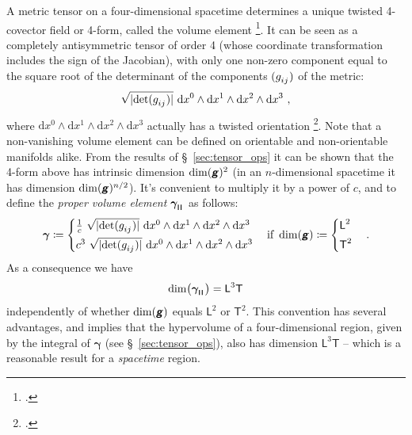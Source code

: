 \documentclass[\ifafour a4paper,12pt,\else a5paper,10pt,\fi%
onecolumn,oneside,article,%
british%
]{memoir}
\makeatletter
\theoremstyle{remark}
\theoremstyle{innote}
\newcommand*{\mathte}[1]{\textbf{\textit{\textsf{#1}}}}
\newcommand*{\citep}{\footcites}
\newcommand*{\delt}{\deltaup}%
\newcommand*{\di}{\mathrm{d}}%
\newcommand*{\defd}{\coloneqq}
\DeclarePairedDelimiter\abs{\lvert}{\rvert}
\renewcommand*{\|}[1][]{\nonscript\,#1\vert\nonscript\;\mathopen{}}
\newcommand*{\sect}{\S}%
\newcommand*{\chap}{ch.}%
\newcommand*{\q}{}%
\DeclareRobustCommand*{\q}{%
  \mathord{\mathpalette\bigcdot@{}}%
}
\newcommand*{\bigcdot@scalefactor}{0.7}
\newcommand*{\bigcdot@widthfactor}{1.5}
\newcommand*{\bigcdot@}[2]{%
  \sbox0{$#1\vcenter{}$}%
  \sbox2{$#1\cdot\m@th$}%
  \hbox to \bigcdot@widthfactor\wd2{%
    \hfil
    \raise\ht0\hbox{%
      \scalebox{\bigcdot@scalefactor}{%
        \lower\ht0\hbox{$#1\bullet\m@th$}%
      }%
    }%
    \hfil
  }%
}
\newcommand*{\Le}{\textsf{L}}
\newcommand*{\Ti}{\textsf{T}}
\newcommand*{\Li}{\textsf{L}}
\newcommand*{\yg}{\mathte{g}}
\renewcommand*{\i}{\indices}
\newcommand*{\dix}[1][i]{\di x^{#1}}
\newcommand*{\ye}{\bm{e}}
\newcommand*{\ygv}{\bm{\gamma}}
\newcommand*{\rul}{{\mkern2mu\rule[-0.1ex]{0.75pt}{1.1ex}\mkern2mu}}
\DeclarePairedDelimiter\mul{\rul}{\rul}%
\makeatother
\begin{document}
A metric tensor on a four-dimensional spacetime determines a unique twisted
4-covector field or 4-form, called the volume element
\citep[\sect~V.24]{derham1955_t1984}[\sect~V.A.4]{choquetbruhatetal1977_r1996}[\sect~6.2]{abrahametal1983_r1988}.
It can be seen as a completely antisymmetric tensor of order 4 (whose
coordinate transformation includes the sign of the Jacobian), with only one
non-zero component equal to the square root of the determinant of
the %
components $(g\i{_{ij}})$ of the metric:
\begin{equation*}
  \label{eq:undim_volume_elem}
  \sqrt{\smash[b]{\abs{\det(g\i{_{ij}})}}}\ \dix[0]\land\dix[1]\land\dix[2]\land\dix[3] \ ,
\end{equation*}
where
$\dix[0]\land\dix[1]\land\dix[2]\land\dix[3]$ %
actually has a twisted orientation \citep[\chap~6 p.~60,
\chap.~9]{frankel1979}. Note that a non-vanishing volume element can be
defined on orientable and non-orientable manifolds alike. From the results
of \sect~\ref{sec:tensor_ops} it can be shown that the 4-form above has
intrinsic dimension $\dim(\yg)^{2}$ (in an $n$-dimensional spacetime it has
dimension $\dim(\yg)^{n/2}$). It's convenient to multiply it by a power of
$c$, and to define the \emph{proper volume element}
$\ygv\i{_{\mul{\q\q\q\q}}}$ as follows:
\begin{equation}
  \label{eq:volume_elem}
  \ygv \defd
      \begin{cases}
        \frac{1}{c}\
        \sqrt{\smash[b]{\abs{\det(g\i{_{ij}})}}}\ \dix[0]\land\dix[1]\land\dix[2]\land\dix[3] 
     \\[\jot]
        c^{3}\
        \sqrt{\smash[b]{\abs{\det(g\i{_{ij}})}}}\ \dix[0]\land\dix[1]\land\dix[2]\land\dix[3] 
  \end{cases}
  \text{if }\dim(\yg)\defd
  \begin{cases}
    \Le^2 \\[\jot]
     \Ti^2
  \end{cases}.
\end{equation}
As a consequence we have
\begin{equation}
  \label{eq:dim_volume_elem}
  \dim\bigl(\ygv\i{_{\mul{\q\q\q\q}}}\bigr) = \Le^{3}\Ti
\end{equation}
independently of whether $\dim(\yg)$ equals $\Li^{2}$ or $\Ti^{2}$. This
convention has several advantages, and implies that the hypervolume of a
four-dimensional region, given by the integral of $\ygv$ (see
\sect~\ref{sec:tensor_ops}), also has dimension $\Li^{3}\Ti$ -- which is a
reasonable result for a \emph{spacetime} region.
\end{document}
